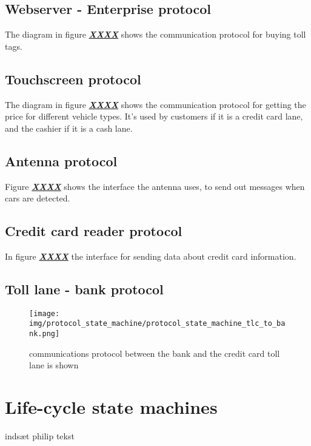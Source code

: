 \subsection*{Webserver - Enterprise protocol}
The diagram in figure \textbf{\underline{\textit{XXXX}}} shows the communication protocol for buying toll tags.
\subsection*{Touchscreen protocol}
The diagram in figure \textbf{\underline{\textit{XXXX}}} shows the communication protocol for getting the price for different vehicle types. It's used by customers if it is a credit card lane, and the cashier if it is a cash lane.
\subsection*{Antenna protocol}
Figure \textbf{\underline{\textit{XXXX}}} shows the interface the antenna uses, to send out messages when cars are detected. 
\subsection*{Credit card reader protocol}
In figure \textbf{\underline{\textit{XXXX}}} the interface for sending data about credit card information.
\subsection*{Toll lane - bank protocol}
\begin{figure}
\centering
\texttt{[image: img/protocol\_state\_machine/protocol\_state\_machine\_tlc\_to\_bank.png]}
\caption{communications protocol between the bank and the credit card toll lane is shown}
\label{fig:protocol_state_machine_tlc_to_bank}
\end{figure}




\section*{Life-cycle state machines}
indsæt philip tekst